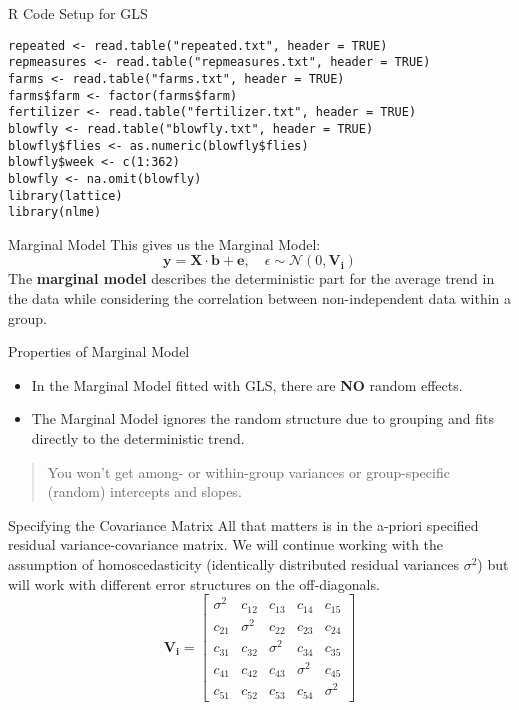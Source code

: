 \documentclass{beamer}
\begin{document}
\begin{frame}[fragile]{R Code Setup for GLS}
  \begin{verbatim}
repeated <- read.table("repeated.txt", header = TRUE)
repmeasures <- read.table("repmeasures.txt", header = TRUE)
farms <- read.table("farms.txt", header = TRUE)
farms$farm <- factor(farms$farm)
fertilizer <- read.table("fertilizer.txt", header = TRUE)
blowfly <- read.table("blowfly.txt", header = TRUE)
blowfly$flies <- as.numeric(blowfly$flies)
blowfly$week <- c(1:362)
blowfly <- na.omit(blowfly)
library(lattice)
library(nlme)
  \end{verbatim}
\end{frame}

\begin{frame}{Marginal Model}
  This gives us the Marginal Model:
  \[
  \mathbf{y} = \mathbf{X} \cdot \mathbf{b} + \mathbf{e}, \quad \epsilon \sim \mathcal{N}(0, \mathbf{V_i})
  \]
  The \textbf{marginal model} describes the deterministic part for the average trend in the data while considering the correlation between non-independent data within a group.
\end{frame}

\begin{frame}{Properties of Marginal Model}
  \begin{itemize}
    \item In the Marginal Model fitted with GLS, there are \textbf{NO} random effects.
    \item The Marginal Model ignores the random structure due to grouping and fits directly to the deterministic trend.
  \end{itemize}
  \begin{quote}
    You won't get among- or within-group variances or group-specific (random) intercepts and slopes.
  \end{quote}
\end{frame}

\begin{frame}{Specifying the Covariance Matrix}
  All that matters is in the a-priori specified residual variance-covariance matrix.
  We will continue working with the assumption of homoscedasticity (identically distributed residual variances $\sigma^2$) but will work with different error structures on the off-diagonals.
  \[
  \mathbf{V_i} = 
  \begin{bmatrix}
  \sigma^2 & c_{12} & c_{13} & c_{14} & c_{15} \\
  c_{21} & \sigma^2 & c_{22} & c_{23} & c_{24} \\
  c_{31} & c_{32} & \sigma^2 & c_{34} & c_{35} \\
  c_{41} & c_{42} & c_{43} & \sigma^2 & c_{45} \\
  c_{51} & c_{52} & c_{53} & c_{54} & \sigma^2
  \end{bmatrix}
  \]
\end{frame}
\end{document}
